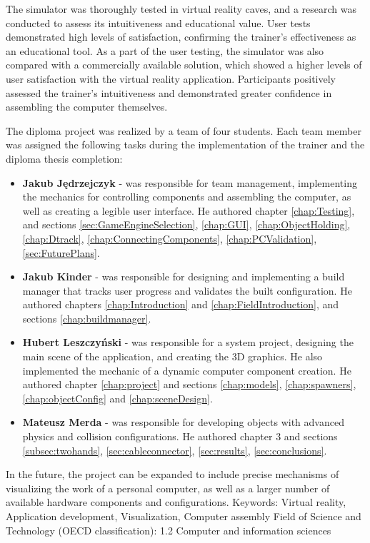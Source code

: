 The simulator was thoroughly tested in virtual reality caves, and a research was conducted to assess its intuitiveness and educational value.
User tests demonstrated high levels of satisfaction, confirming the trainer's effectiveness as an educational tool.
As a part of the user testing, the simulator was also compared with a commercially available solution, which showed a higher levels of user satisfaction with the virtual reality application.
Participants positively assessed the trainer's intuitiveness and demonstrated greater confidence in assembling the computer themselves.

\newpage The diploma project was realized by a team of four students.
Each team member was assigned the following tasks during the implementation of the trainer and the diploma thesis completion:
\begin{itemize}
    \item \textbf{Jakub Jędrzejczyk} - was responsible for team management, implementing the mechanics for controlling components and assembling the computer, as well as creating a legible user interface. He authored chapter \ref{chap:Testing}, and sections \ref{sec:GameEngineSelection}, \ref{chap:GUI}, \ref{chap:ObjectHolding}, \ref{chap:Dtrack}, \ref{chap:ConnectingComponents}, \ref{chap:PCValidation}, \ref{sec:FuturePlans}.
    \item \textbf{Jakub Kinder} - was responsible for designing and implementing a build manager that tracks user progress and validates the built configuration. He authored chapters \ref{chap:Introduction} and \ref{chap:FieldIntroduction}, and sections \ref{chap:buildmanager}. 
    \item \textbf{Hubert Leszczyński} - was responsible for a system project, designing the main scene of the application, and creating the 3D graphics. He also implemented the mechanic of a dynamic computer component creation. He authored chapter \ref{chap:project} and sections \ref{chap:models}, \ref{chap:spawners}, \ref{chap:objectConfig} and \ref{chap:sceneDesign}.
    \item \textbf{Mateusz Merda} - was responsible for developing objects with advanced physics and collision configurations. He authored chapter 3 and sections \ref{subsec:twohands}, \ref{sec:cableconnector}, \ref{sec:results}, \ref{sec:conclusions}.
\end{itemize}

In the future, the project can be expanded to include precise mechanisms of visualizing the work of a personal computer, as well as a larger number of available hardware components and configurations.
\newline Keywords: Virtual reality, Application development, Visualization, Computer assembly
\newline Field of Science and Technology (OECD classification): 1.2 Computer and information sciences